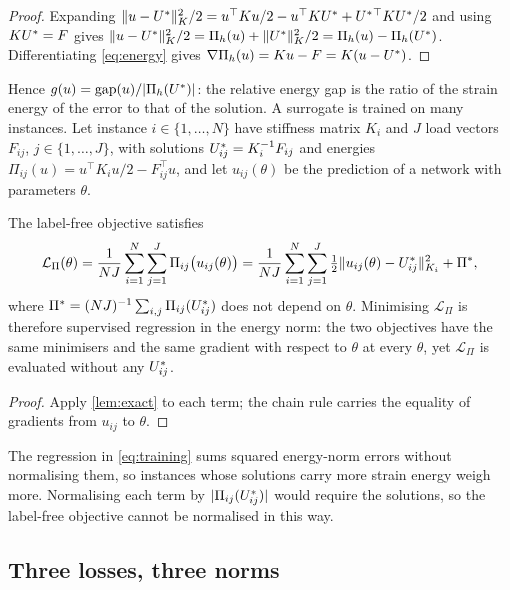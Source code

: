\begin{proof}
Expanding $\lVert u-U^{\ast}\rVert_K^2/2=u^{\top}Ku/2-u^{\top}KU^{\ast}
+U^{\ast}{}^{\top}KU^{\ast}/2$ and using $KU^{\ast}=F$ gives
$\lVert u-U^{\ast}\rVert_K^2/2=\Pi_h(u)+\lVert U^{\ast}\rVert_K^2/2=\Pi_h(u)-\Pi_h(U^{\ast})$.
Differentiating \eqref{eq:energy} gives $\nabla\Pi_h(u)=Ku-F=K(u-U^{\ast})$.
\end{proof}

Hence $g(u)=\operatorname{gap}(u)/\lvert\Pi_h(U^{\ast})\rvert$: the relative energy gap is the ratio of the
strain energy of the error to that of the solution. A surrogate is trained on many
instances. Let instance $i\in\{1,\dots,N\}$ have stiffness matrix $K_i$ and $J$ load
vectors $F_{ij}$, $j\in\{1,\dots,J\}$, with solutions $U^{\ast}_{ij}=K_i^{-1}F_{ij}$ and
energies $\Pi_{ij}(u)=u^{\top}K_iu/2-F_{ij}^{\top}u$, and let $u_{ij}(\theta)$ be the
prediction of a network with parameters $\theta$.

\begin{corollary}\label{cor:training}
The label-free objective satisfies
\begin{equation}
\mathcal{L}_{\Pi}(\theta) =
\frac{1}{NJ}\sum_{i=1}^{N}\sum_{j=1}^{J}\Pi_{ij}\bigl(u_{ij}(\theta)\bigr) =
\frac{1}{NJ}\sum_{i=1}^{N}\sum_{j=1}^{J}\tfrac12\lVert u_{ij}(\theta)-U^{\ast}_{ij}\rVert_{K_i}^{2}
+ \Pi^{\ast},
\label{eq:training}
\end{equation}
where $\Pi^{\ast}=(NJ)^{-1}\sum_{i,j}\Pi_{ij}(U^{\ast}_{ij})$ does not depend on $\theta$.
Minimising $\mathcal{L}_\Pi$ is therefore supervised regression in the energy norm: the
two objectives have the same minimisers and the same gradient with respect to $\theta$ at
every $\theta$, yet $\mathcal{L}_\Pi$ is evaluated without any $U^{\ast}_{ij}$.
\end{corollary}

\begin{proof}
Apply \cref{lem:exact} to each term; the chain rule carries the equality of gradients
from $u_{ij}$ to $\theta$.
\end{proof}

The regression in \eqref{eq:training} sums squared energy-norm errors without
normalising them, so instances whose solutions carry more strain energy weigh more.
Normalising each term by $\lvert\Pi_{ij}(U^{\ast}_{ij})\rvert$ would require the solutions,
so the label-free objective cannot be normalised in this way.

\subsection{Three losses, three norms}\label{sec:theory:norms}

